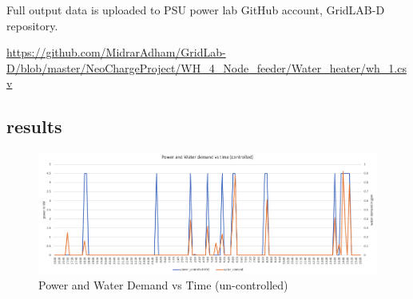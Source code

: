     \par Full output data is uploaded to PSU power lab GitHub account, GridLAB-D repository.
    
    \url{https://github.com/MidrarAdham/GridLab-D/blob/master/NeoChargeProject/WH_4_Node_feeder/Water_heater/wh_1.csv}
\newpage
\subsection{results}
        \begin{figure}[hbt!]
            \includegraphics[scale=0.5]{Pictures/controlled_WH.png}
            \caption{Power and Water Demand vs Time (un-controlled)}
            \label{fig:uncontrolled_wh}
        \end{figure}

\newpage